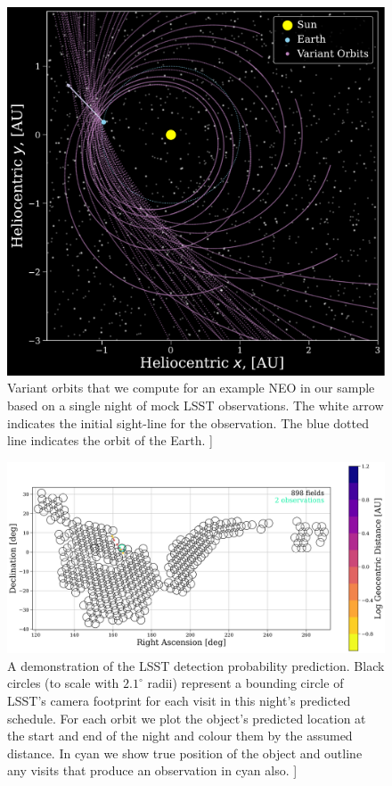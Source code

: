 \documentclass[twocolumn]{aastex631}
\newcommand{\todo}[1]{{\color{red}{[TODO: #1}]}}
\begin{document}
\begin{figure}[htb]
    \centering
    \includegraphics[width=\columnwidth]{orbits_example.pdf}
    \caption{Variant orbits that we compute for an example NEO in our sample based on a single night of mock LSST observations. The white arrow indicates the initial sight-line for the observation. The blue dotted line indicates the orbit of the Earth. \todo{unsure if this plot belongs, but it helped me visualise the orbits}}
    \label{fig:orbits}
\end{figure}

\begin{figure}[htb]
    \centering
    \includegraphics[width=\columnwidth]{methods_placeholder.png}
    \caption{A demonstration of the LSST detection probability prediction. Black circles (to scale with $2.1^{\circ}$ radii) represent a bounding circle of LSST's camera footprint for each visit in this night's predicted schedule. For each orbit we plot the object's predicted location at the start and end of the night and colour them by the assumed distance. In cyan we show true position of the object and outline any visits that produce an observation in cyan also. \todo{pick a nice object for this plot, also try molleweide projection}}
    \label{fig:circles}
\end{figure}
\end{document}
